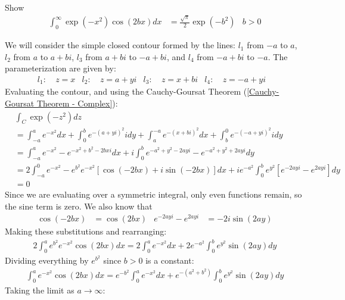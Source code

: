 \documentclass[12pt, english]{book}
\makeatletter
\renewenvironment{proof}[1][\proofname]{\par
	\pushQED{\qed}%
	\normalfont \topsep6\p@\@plus6\p@\relax
	\list{}{%
		\settowidth{\leftmargin}{\itshape\proofname:\hskip\labelsep}%
		\setlength{\labelwidth}{0pt}%
		\setlength{\itemindent}{-\leftmargin}%
	}%
	\item[\hskip\labelsep\itshape#1\@addpunct{:}]\ignorespaces
	}{ \popQED\endlist\@endpefalse}
\makeatother
\begin{document}
	\begin{example}
		Show
		\begin{align*}
			\int_{0}^{\infty} \exp(-x^2) \cos(2bx) dx &= \frac{\sqrt{\pi}}{2} \exp(-b^2) 
				& b>0
		\end{align*}
		\begin{proof}
			{\color{Grey}
			We will consider the simple closed contour formed by the lines: \(l_1\) from \(-a\) to \(a\), \(l_2\) from \(a\) to \(a + bi\), \(l_3\) from \(a+bi\) to \(-a+bi\), and \(l_4\) from \(-a+bi\) to \(-a\). The parameterization are given by:
			\begin{align*}
				l_1:& \ z=x	&
				l_2:& \ z=a+yi &
				l_3:& \ z=x+bi &
				l_4:& \ z=-a+yi &
			\end{align*}
			Evaluating the contour, and using the Cauchy-Goursat Theorem (\cref{Cauchy-Goursat Theorem - Complex}):
			\begin{align*}
				&\int_{C} \exp(-z^2) dz \\
				&= \int_{-a}^{a} e^{-x^2} dx + \int_{0}^{b} e^{-(a+yi)^2} i dy + \int_{a}^{-a} e^{-(x+bi)^2} dx + \int_{b}^{0} e^{-(-a+yi)^2} i dy \\
				&= \int_{-a}^{a} e^{-x^2} - e^{-x^2 + b^2 - 2bxi} dx 
					+ i \int_{0}^{b} e^{-a^2 + y^2 - 2ayi} - e^{-a^2 + y^2 + 2ayi} dy\\
				&= 2\int_{-a}^{0} e^{-x^2} - e^{b^2} e^{-x^2} [\cos(-2bx) + i\sin(-2bx)] dx 
					+ i e^{-a^2} \int_{0}^{b} e^{y^2}[e^{-2ayi} - e^{2ayi}] dy \\
				&= 0
			\end{align*}
			Since we are evaluating over a symmetric integral, only even functions remain, so the sine term is zero. We also know that 
			\begin{align*}
				\cos(-2bx) &= \cos(2bx) & e^{-2ayi} - e^{2ayi} &= -2i\sin(2ay)
			\end{align*}
			Making these substitutions and rearranging:
			\begin{align*}
				2\int_{0}^{a} e^{b^2} e^{-x^2} \cos(2bx) dx 
				= 2 \int_{0}^{a} e^{-x^2} dx + 2 e^{-a^2} \int_{0}^{b} e^{y^2} \sin(2ay) dy
			\end{align*}
			Dividing everything by \(e^{b^2}\) since \(b>0\) is a constant:
			\begin{align*}
				\int_{0}^{a} e^{-x^2} \cos(2bx) dx 
				 = e^{-b^2} \int_{0}^{a} e^{-x^2} dx 
				 	+ e^{-(a^2 + b^2)} \int_{0}^{b} e^{y^2} \sin(2ay) dy
			\end{align*}
			Taking the limit as \(a \rightarrow \infty\):
			\begin{align*}

\end{align*}}
\end{proof}
\end{example}
\end{document}
